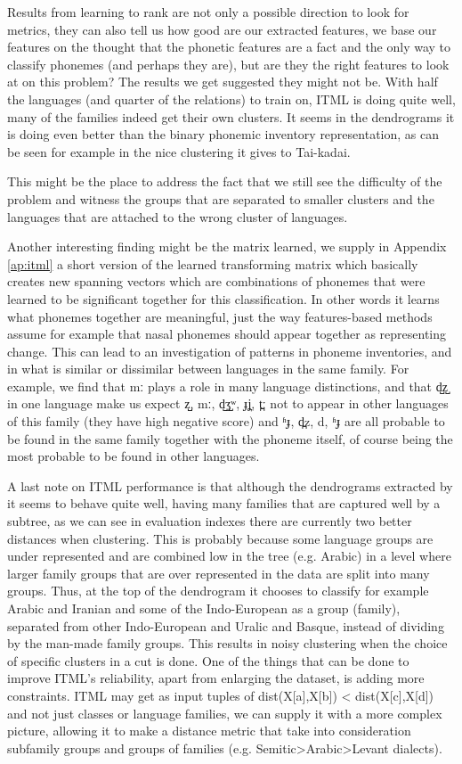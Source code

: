 \documentclass[letterpaper, 11pt]{article}
\begin{document}
Results from learning to rank are not only a possible direction to look for metrics, they can also tell us how good are our extracted features, we base our features on the thought that the phonetic features are a fact and the only way to classify phonemes (and perhaps they are), but are they the right features to look at on this problem? The results we get suggested they might not be. With half the languages (and quarter of the relations) to train on, ITML is doing quite well, many of the families indeed get their own clusters. It seems in the dendrograms it is doing even better than the binary phonemic inventory representation, as can be seen for example in the nice clustering it gives to Tai-kadai. 

This might be the place to address the fact that we still see the difficulty of the problem and witness the groups that are separated to smaller clusters and the languages that are attached to the wrong cluster of languages. 

Another interesting finding might be the matrix learned, we supply in Appendix \ref{ap:itml} a short version of the learned transforming matrix which basically creates new spanning vectors which are combinations of phonemes that were learned to be significant together for this classification. In other words it learns what phonemes together are meaningful, just the way features-based methods assume for example that nasal phonemes should appear together as representing change. This can lead to an investigation of patterns in phoneme inventories, and in what is similar or dissimilar between languages in the same family. For example, we find that mː plays a role in many language distinctions, and that d̺z̺ in one language make us expect z̺,  mː, d̺ʒ̺ʷ,  ɟʝ̞,  t̪ː not to appear in other languages of this family (they have high negative score) and ʱɟ, d̪z, d, ʱɟ are all probable to be found in the same family together with the phoneme itself, of course being the most probable to be found in other languages.

A last note on ITML performance is that although the dendrograms extracted by it seems to behave quite well, having many families that are captured well by a subtree, as we can see in evaluation indexes there are currently two better distances when clustering. This is probably because some language groups are under represented and are combined low in the tree (e.g. Arabic) in a level where larger family groups that are over represented in the data are split into many groups. Thus, at the top of the dendrogram it chooses to classify for example Arabic and Iranian and some of the Indo-European as a group (family), separated from other Indo-European and Uralic and Basque, instead of dividing by the man-made family groups. This results in noisy clustering when the choice of specific clusters in a cut is done. One of the things that can be done to improve ITML's reliability, apart from enlarging the dataset, is adding more constraints. ITML may get as input tuples of dist(X[a],X[b]) < dist(X[c],X[d]) and not just classes or language families, we can supply it with a more complex picture, allowing it to make a distance metric that take into consideration subfamily groups and groups of families (e.g. Semitic>Arabic>Levant dialects).
\end{document}
